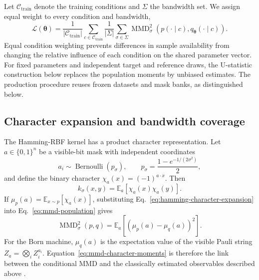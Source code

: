 \documentclass[pra,aps,10pt,twocolumn,floatfix,superscriptaddress,
notitlepage,longbibliography]{revtex4-2}
\newcommand{\bits}{\{0,1\}}
\newcommand{\E}{\mathbb{E}}
\newcommand{\mmd}{\operatorname{MMD}}
\begin{document}
Let $\mathcal C_{\mathrm{train}}$ denote the training conditions and $\Sigma$ the bandwidth set. We assign equal weight to every condition and bandwidth,
\begin{equation}
\mathcal{L}(\boldsymbol\theta)=\frac{1}{|\mathcal C_{\mathrm{train}}|}
\sum_{c\in\mathcal C_{\mathrm{train}}}\frac{1}{|\Sigma|}
\sum_{\sigma\in\Sigma}\mmd^2_\sigma\!\left(p(\cdot\mid c),
q_{\boldsymbol\theta}(\cdot\mid c)\right).
\label{eq:conditional-objective}
\end{equation}
Equal condition weighting prevents differences in sample availability from changing the relative influence of each condition on the shared parameter vector. For fixed parameters and independent target and reference draws, the U-statistic construction below replaces the population moments by unbiased estimates. The production procedure reuses frozen datasets and mask banks, as distinguished below.

\subsection{Character expansion and bandwidth coverage}

The Hamming-RBF kernel has a product character representation. Let $a\in\bits^n$ be a visible-bit mask with independent coordinates
\begin{equation}
    a_i\sim\operatorname{Bernoulli}(p_\sigma),
    \qquad
    p_\sigma=\frac{1-e^{-1/(2\sigma^2)}}{2},
    \label{eq:mmd-mask-law}
\end{equation}
and define the binary character $\chi_a(x)=(-1)^{a\cdot x}$. Then
\begin{equation}
    k_\sigma(x,y)=\E_a\!\left[\chi_a(x)\chi_a(y)\right].
    \label{eq:hamming-character-expansion}
\end{equation}
If $\mu_p(a)=\E_{x\sim p}[\chi_a(x)]$, substituting Eq.~\eqref{eq:hamming-character-expansion} into Eq.~\eqref{eq:mmd-population} gives
\begin{equation}
    \mmd_\sigma^2(p,q)=
    \E_a\!\left[\left(\mu_p(a)-\mu_q(a)\right)^2\right].
    \label{eq:mmd-character-moments}
\end{equation}
For the Born machine, $\mu_q(a)$ is the expectation value of the visible Pauli string $Z_a=\bigotimes_i Z_i^{a_i}$. Equation~\eqref{eq:mmd-character-moments} is therefore the link between the conditional MMD and the classically estimated observables described above \cite{recio-armengolIQPoptFastOptimization2025,recio-armengolTrainClassicalDeploy2026}.
\end{document}
